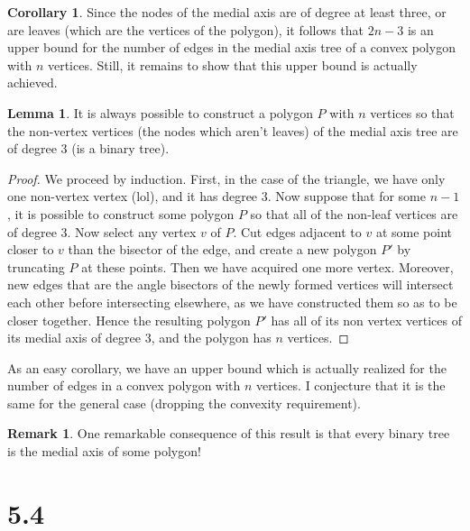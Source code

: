 \documentclass[12pt]{article}
\theoremstyle{definition}
\newtheorem{lemma}{Lemma}
\newtheorem{corollary}{Corollary}
\newtheorem{remark}{Remark}
\begin{document}
\begin{corollary}
Since the nodes of the medial axis are of degree at least three, or are leaves (which are the vertices of the polygon), it follows that $2n-3$ is an upper bound for the number of edges in the medial axis tree of a convex polygon with $n$ vertices. Still, it remains to show that this upper bound is actually achieved.
\end{corollary}

\begin{lemma}
It is always possible to construct a polygon $P$ with $n$ vertices so that the non-vertex vertices (the nodes which aren't leaves) of the medial axis tree are of degree  $3$ (is a binary tree). 
\end{lemma}

\begin{proof}
We proceed by induction. First, in the case of the triangle, we have only one non-vertex vertex (lol), and it has degree $3$. Now suppose that for some $n-1$, it is possible to construct some polygon $P$ so that all of the non-leaf vertices are of degree $3$. Now select any vertex $v$ of $P$. Cut edges adjacent to $v$ at some point closer to $v$ than the bisector of the edge, and create a new polygon $P'$ by truncating $P$ at these points. Then we have acquired one more vertex. Moreover, new edges that are the angle bisectors of the newly formed vertices will intersect each other before intersecting elsewhere, as we have constructed them so as to be closer together. Hence the resulting polygon $P'$ has all of its non vertex vertices of its medial axis of degree $3$, and the polygon has $n$ vertices.
\end{proof}

As an easy corollary, we have an upper bound which is actually realized for the number of edges in a convex polygon with $n$ vertices. I conjecture that it is the same for the general case (dropping the convexity requirement).

\begin{remark}
One remarkable consequence of this result is that every binary tree is the medial axis of some polygon!
\end{remark}

\section{5.4}
\end{document}
